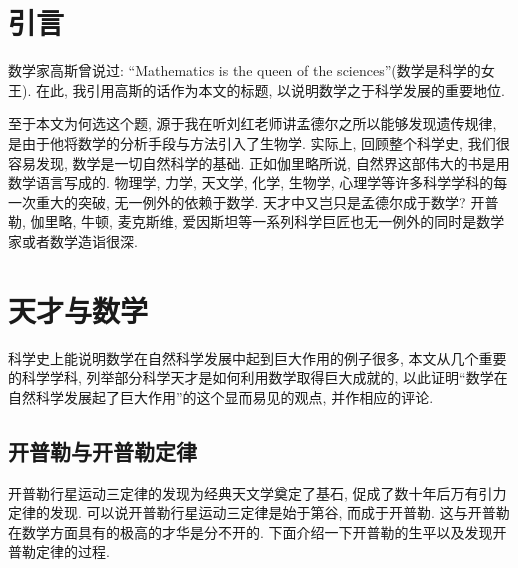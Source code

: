\documentclass[11pt,a4paper,boxed]{caspset}
\begin{document}

\section{引言}

数学家高斯曾说过: ``Mathematics is the queen of the sciences''(数学是科学的女王). 在此, 我引用高斯的话作为本文的标题, 以说明数学之于科学发展的重要地位.

至于本文为何选这个题, 源于我在听刘红老师讲孟德尔之所以能够发现遗传规律, 是由于他将数学的分析手段与方法引入了生物学. 实际上, 回顾整个科学史, 我们很容易发现, 数学是一切自然科学的基础. 正如伽里略所说, 自然界这部伟大的书是用数学语言写成的. 物理学, 力学, 天文学, 化学, 生物学, 心理学等许多科学学科的每一次重大的突破, 无一例外的依赖于数学. 天才中又岂只是孟德尔成于数学? 开普勒, 伽里略, 牛顿, 麦克斯维, 爱因斯坦等一系列科学巨匠也无一例外的同时是数学家或者数学造诣很深.

\section{天才与数学}
科学史上能说明数学在自然科学发展中起到巨大作用的例子很多, 本文从几个重要的科学学科, 列举部分科学天才是如何利用数学取得巨大成就的, 以此证明``数学在自然科学发展起了巨大作用''的这个显而易见的观点, 并作相应的评论.
\subsection{开普勒与开普勒定律}

开普勒行星运动三定律的发现为经典天文学奠定了基石, 促成了数十年后万有引力定律的发现. 可以说开普勒行星运动三定律是始于第谷, 而成于开普勒. 这与开普勒在数学方面具有的极高的才华是分不开的. 下面介绍一下开普勒的生平以及发现开普勒定律的过程.
\end{document}
